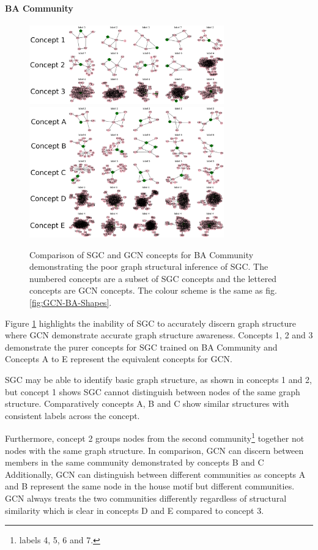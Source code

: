 \paragraph{BA Community}
\begin{figure}
    \centering
    \includegraphics[width=0.75\textwidth]{figures/SGC-BA-Community}
    \includegraphics[width=0.75\textwidth]{figures/GCN-BA-Community}
    \caption{Comparison of SGC and GCN concepts for BA Community demonstrating the poor graph structural inference of SGC. The numbered concepts are a subset of SGC concepts and the lettered concepts are GCN concepts. The colour scheme is the same as fig. \ref{fig:GCN-BA-Shapes}.}
    \label{fig:BA-Community}
\end{figure}

Figure \ref{fig:BA-Community} highlights the inability of SGC to accurately discern graph structure where GCN demonstrate accurate graph structure awareness.
Concepts 1, 2 and 3 demonstrate the purer concepts for SGC trained on BA Community and Concepts A to E represent the equivalent concepts for GCN.

SGC may be able to identify basic graph structure, as shown in concepts 1 and 2, but concept 1 shows SGC cannot distinguish between nodes of the same graph structure.
Comparatively concepts A, B and C show similar structures with consistent labels across the concept.

Furthermore, concept 2 groups nodes from the second community\footnote{labels 4, 5, 6 and 7.} together not nodes with the same graph structure.
In comparison, GCN can discern between members in the same community demonstrated by concepts B and C
Additionally, GCN can distinguish between different communities as concepts A and B represent the same node in the house motif but different communities.
GCN always treats the two communities differently regardless of structural similarity which is clear in concepts D and E compared to concept 3.

